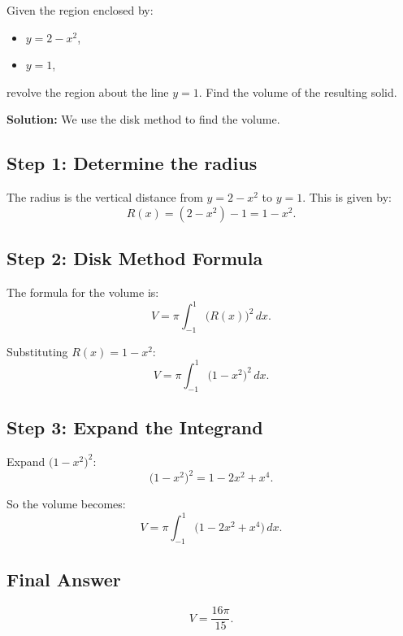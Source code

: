 \documentclass[12pt]{article}
\theoremstyle{beautifulthm}
\begin{document}
\begin{tcolorbox}[colback=examplebg, colframe=red!75!black, title=\textbf{EXAMPLE 1: Volume of Solid Generated by Rotating Region \( R \)}, fonttitle=\bfseries, sharp corners]

Given the region enclosed by:
\begin{itemize}
    \item \( y = 2 - x^2 \),
    \item \( y = 1 \),
\end{itemize}
revolve the region about the line \( y = 1 \). Find the volume of the resulting solid.

\tcblower
\textbf{Solution:} 
We use the disk method to find the volume.

\subsection*{Step 1: Determine the radius}
The radius is the vertical distance from \( y = 2 - x^2 \) to \( y = 1 \). This is given by:
\[
R(x) = (2 - x^2) - 1 = 1 - x^2.
\]

\subsection*{Step 2: Disk Method Formula}
The formula for the volume is:
\[
V = \pi \int_{-1}^{1} \big( R(x) \big)^2 \, dx.
\]

Substituting \( R(x) = 1 - x^2 \):
\[
V = \pi \int_{-1}^{1} \big( 1 - x^2 \big)^2 \, dx.
\]

\subsection*{Step 3: Expand the Integrand}
Expand \( \big( 1 - x^2 \big)^2 \):
\[
\big( 1 - x^2 \big)^2 = 1 - 2x^2 + x^4.
\]

So the volume becomes:
\[
V = \pi \int_{-1}^{1} \big( 1 - 2x^2 + x^4 \big) \, dx.
\]



\subsection*{Final Answer}
\[
V = \frac{16\pi}{15}.
\]



\end{tcolorbox}
\end{document}
